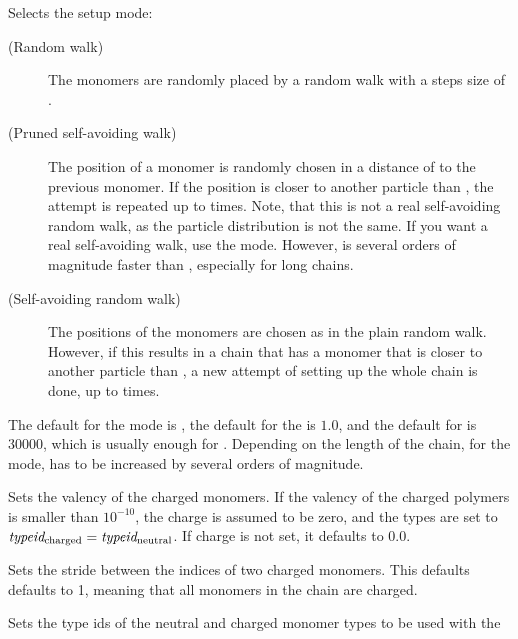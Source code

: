 \begin{arguments}
\item[\opt{mode \alt{RW  \asep  PSAW  \asep  SAW} \opt{\var{shield}
      \opt{\var{try_\mathrm{max}}}}}]
  Selects the setup mode:
  \begin{description}
  \item[ (Random walk)] The monomers are
    randomly placed by a random walk with a steps size of
    .
  \item[ (Pruned self-avoiding walk)] The position of a
    monomer is randomly chosen in a distance of  to
    the previous monomer. If the position is closer to another
    particle than , the attempt is repeated up to
     times. Note, that this is not a real
    self-avoiding random walk, as the particle distribution is not the
    same. If you want a real self-avoiding walk, use the 
    mode.  However,  is several orders of magnitude
    faster than , especially for long chains.
  \item[ (Self-avoiding random walk)] The positions of
    the monomers are chosen as in the plain random walk. However, if
    this results in a chain that has a monomer that is closer to
    another particle than , a new attempt of setting up
    the whole chain is done, up to  times.
  \end{description}
  The default for the mode is , the default for the
   is $1.0$, and the default for  is
  $30000$, which is usually enough for . Depending on
  the length of the chain, for the  mode,
   has to be increased by several orders of
  magnitude.
\item[\opt{charge \var{valency}}] Sets the valency of the charged
  monomers.  If the valency of the charged polymers  is
  smaller than $10^{-10}$, the charge is assumed to be zero, and the
  types are set to $\mathrm{\mathit{typeid_\mathrm{charged}}} =
  \mathrm{\mathit{typeid_\mathrm{neutral}}}$. If charge is not set, it defaults to
  0.0.
\item[\opt{distance \var{d_\mathrm{charged}}}] Sets the stride
  between the indices of two charged monomers. This defaults defaults
  to 1, meaning that all monomers in the chain are charged.
\item[\opt{types \var{typeid_\mathrm{neutral}}
    \var{typeid_\mathrm{charged}}}] Sets the type ids of the neutral
    and charged monomer types to be used with the 

\end{arguments}
